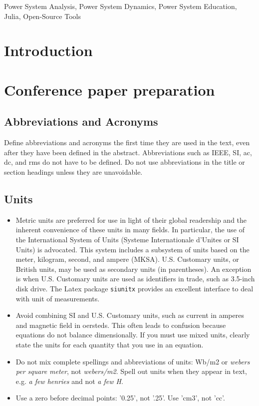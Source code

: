 \documentclass{IEEEtran4PSCC}
\begin{document}
\begin{IEEEkeywords}
  Power System Analysis, Power System Dynamics, Power System Education, Julia, Open-Source Tools
\end{IEEEkeywords}




\section{Introduction}
\lipsum[1-3]

\section{Conference paper preparation}
\lipsum[1-3]

\subsection{Abbreviations and Acronyms}
Define abbreviations and acronyms the first time they are used in the text, even after they have been defined in the abstract. Abbreviations such as IEEE, SI, ac, dc, and rms do not have to be defined. Do not use abbreviations in the title or section headings unless they are unavoidable.


\subsection{Units}
\begin{itemize}
\setlength\itemsep{1em}
 \item
 Metric units are preferred for use in light of their global readership and the inherent convenience of these units in many fields. In particular, the use of the International System of Units (Systeme Internationale d'Unites or SI Units) is advocated. This system includes a subsystem of units based on the meter, kilogram, second, and ampere (MKSA). U.S. Customary units, or British units, may be used as secondary units (in parentheses). An exception is when U.S. Customary units are used as identifiers in trade, such as 3.5-inch disk drive. The Latex package \verb+siunitx+ provides an excellent interface to deal with unit of measurements.
 
 \item 
 Avoid combining SI and U.S. Customary units, such as current in amperes and magnetic field in oersteds. This often leads to confusion because equations do not balance dimensionally. If you must use mixed units, clearly state the units for each quantity that you use in an equation.
 
 \item
 Do not mix complete spellings and abbreviations of units: Wb/m2 or \emph{webers per square meter}, not \emph{webers/m2}.  Spell out units when they appear in text, e.g. \emph{a few henries} and not \emph{a few H}.
 
 \item
 Use a zero before decimal points: '0.25', not '.25'. Use 'cm3', not 'cc'.
\end{itemize}
\end{document}
